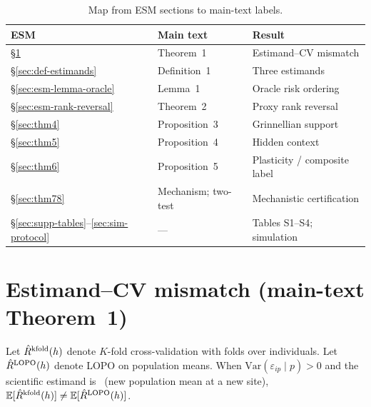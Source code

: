 \documentclass[11pt]{article}
\begin{document}
\begin{table}[h]
  \caption{Map from ESM sections to main-text labels.}
  \label{tab:esm-map}
  \begin{center}
  \small
  \begin{tabular}{lll}
    \toprule
    ESM & Main text & Result \\
    \midrule
    \S\ref{sec:thm1} & Theorem~1 & Estimand--CV mismatch \\
    \S\ref{sec:def-estimands} & Definition~1 & Three estimands \\
    \S\ref{sec:esm-lemma-oracle} & Lemma~1 & Oracle risk ordering \\
    \S\ref{sec:esm-rank-reversal} & Theorem~2 & Proxy rank reversal \\
    \S\ref{sec:thm4} & Proposition~3 & Grinnellian support \\
    \S\ref{sec:thm5} & Proposition~4 & Hidden context \\
    \S\ref{sec:thm6} & Proposition~5 & Plasticity / composite label \\
    \S\ref{sec:thm78} & Mechanism; two-test & Mechanistic certification \\
    \S\ref{sec:supp-tables}--\ref{sec:sim-protocol} & --- & Tables S1--S4; simulation \\
    \bottomrule
  \end{tabular}
  \end{center}
\end{table}

\section{Estimand--CV mismatch (main-text Theorem~1)}
\label{sec:thm1}

\begin{theorem}
\label{thm:esm-estimand-cv}
Let $\hat{R}^{\mathrm{kfold}}(h)$ denote $K$-fold cross-validation with folds over
individuals.  Let $\hat{R}^{\mathrm{LOPO}}(h)$ denote LOPO on population means.  When
$\mathrm{Var}(\varepsilon_{ip}\mid p)>0$ and the scientific estimand
is \Etwo\ (new population mean at a new site),
$\mathbb{E}[\hat{R}^{\mathrm{kfold}}(h)] \neq \mathbb{E}[\hat{R}^{\mathrm{LOPO}}(h)]$.
\end{theorem}
\end{document}

